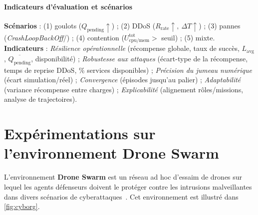 \paragraph{Indicateurs d'évaluation et scénarios}

\textbf{Scénarios} : (1) goulots (\(Q_{\text{pending}}\uparrow\)) ; (2) DDoS (\(R_{\text{rate}}\uparrow,\ \Delta T\uparrow\)) ; (3) pannes (\textit{CrashLoopBackOff}/) ; (4) contention (\(U_{\text{cpu/mem}}^{\text{tot}}>\) seuil) ; (5) mixte. \textbf{Indicateurs} : \emph{Résilience opérationnelle} (récompense globale, taux de succès, \(L_{\text{avg}}\), \(\overline{Q_{\text{pending}}}\), disponibilité) ; \emph{Robustesse aux attaques} (écart-type de la récompense, temps de reprise DDoS, \% services disponibles) ; \emph{Précision du jumeau numérique} (écart simulation/réel) ; \emph{Convergence} (épisodes jusqu'au palier) ; \emph{Adaptabilité} (variance récompense entre charges) ; \emph{Explicabilité} (alignement rôles/missions, analyse de trajectoires).




\section{Expérimentations sur l'environnement Drone Swarm}

L'environnement \textbf{Drone Swarm} est un réseau ad hoc d'essaim de drones sur lequel les agents défenseurs doivent le protéger contre les intrusions malveillantes dans divers scénarios de cyberattaques~\cite{Standen2021}. Cet environnement est illustré dans \autoref{fig:cyborg}.

